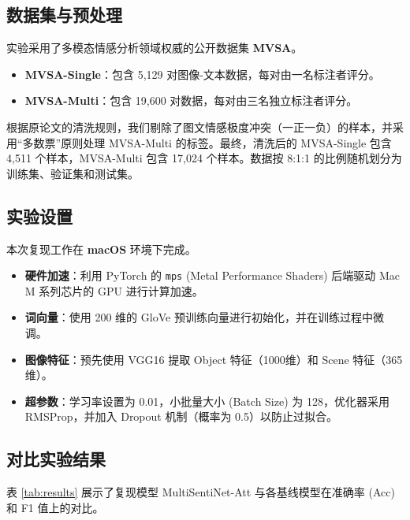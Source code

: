 \documentclass[conference, 12pt,onecolumn]{IEEEtran}
\begin{document}
\subsection{数据集与预处理}
实验采用了多模态情感分析领域权威的公开数据集 \textbf{MVSA}。
\begin{itemize}
    \item \textbf{MVSA-Single}：包含 5,129 对图像-文本数据，每对由一名标注者评分。
    \item \textbf{MVSA-Multi}：包含 19,600 对数据，每对由三名独立标注者评分。
\end{itemize}

根据原论文的清洗规则，我们剔除了图文情感极度冲突（一正一负）的样本，并采用“多数票”原则处理 MVSA-Multi 的标签。最终，清洗后的 MVSA-Single 包含 4,511 个样本，MVSA-Multi 包含 17,024 个样本。数据按 8:1:1 的比例随机划分为训练集、验证集和测试集。

\subsection{实验设置}
本次复现工作在 \textbf{macOS} 环境下完成。
\begin{itemize}
    \item \textbf{硬件加速}：利用 PyTorch 的 \texttt{mps} (Metal Performance Shaders) 后端驱动 Mac M 系列芯片的 GPU 进行计算加速。
    \item \textbf{词向量}：使用 200 维的 GloVe 预训练向量进行初始化，并在训练过程中微调。
    \item \textbf{图像特征}：预先使用 VGG16 提取 Object 特征（1000维）和 Scene 特征（365维）。
    \item \textbf{超参数}：学习率设置为 0.01，小批量大小 (Batch Size) 为 128，优化器采用 RMSProp，并加入 Dropout 机制（概率为 0.5）以防止过拟合。
\end{itemize}

\subsection{对比实验结果}
表 \ref{tab:results} 展示了复现模型 MultiSentiNet-Att 与各基线模型在准确率 (Acc) 和 F1 值上的对比。
\end{document}
